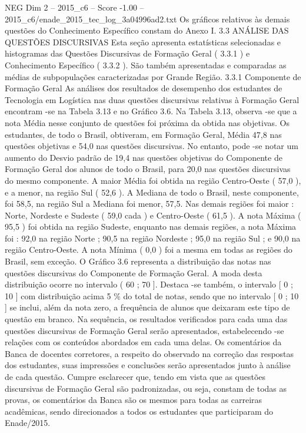\begin{textsample}{NEG Dim 2 – 2015\_c6 – Score -1.00 – 2015\_c6/enade\_2015\_tec\_log\_3a04996ad2.txt}
Os gráficos relativos às demais questões do Conhecimento Específico constam do Anexo I. 3.3 ANÁLISE DAS QUESTÕES DISCURSIVAS Esta seção apresenta estatísticas selecionadas e histogramas das Questões Discursivas de Formação Geral ( 3.3.1 ) e Conhecimento Específico ( 3.3.2 ).
São também apresentadas e comparadas as médias de subpopulações caracterizadas por Grande Região. 3.3.1 Componente de Formação Geral As análises dos resultados de desempenho dos estudantes de Tecnologia em Logística nas duas questões discursivas relativas à Formação Geral encontram -se na Tabela 3.13 e no Gráfico 3.6.
Na Tabela 3.13, observa -se que a nota Média nesse conjunto de questões foi próxima da obtida nas objetivas.
Os estudantes, de todo o Brasil, obtiveram, em Formação Geral, Média 47,8 nas questões objetivas e 54,0 nas questões discursivas.
No entanto, pode -se notar um aumento do Desvio padrão de 19,4 nas questões objetivas do Componente de Formação Geral dos alunos de todo o Brasil, para 20,0 nas questões discursivas do mesmo componente.
A maior Média foi obtida na região Centro-Oeste ( 57,0 ), e a menor, na região Sul ( 52,6 ).
A Mediana de todo o Brasil, neste componente, foi 58,5, na região Sul a Mediana foi menor, 57,5.
Nas demais regiões foi maior : Norte, Nordeste e Sudeste ( 59,0 cada ) e Centro-Oeste ( 61,5 ).
A nota Máxima ( 95,5 ) foi obtida na região Sudeste, enquanto nas demais regiões, a nota Máxima foi : 92,0 na região Norte ; 90,5 na região Nordeste ; 95,0 na região Sul ; e 90,0 na região Centro-Oeste.
A nota Mínima ( 0,0 ) foi a mesma em todas as regiões do Brasil, sem exceção.
O Gráfico 3.6 representa a distribuição das notas nas questões discursivas do Componente de Formação Geral.
A moda desta distribuição ocorre no intervalo ( 60 ; 70 ].
Destaca -se também, o intervalo [ 0 ; 10 ] com distribuição acima 5 \% do total de notas, sendo que no intervalo [ 0 ; 10 ] se inclui, além da nota zero, a frequência de alunos que deixaram este tipo de questão em branco.
Na sequência, os resultados verificados para cada uma das questões discursivas de Formação Geral serão apresentados, estabelecendo -se relações com os conteúdos abordados em cada uma delas.
Os comentários da Banca de docentes corretores, a respeito do observado na correção das respostas dos estudantes, suas impressões e conclusões serão apresentados junto à análise de cada questão.
Cumpre esclarecer que, tendo em vista que as questões discursivas de Formação Geral são padronizadas, ou seja, constam de todas as provas, os comentários da Banca são os mesmos para todas as carreiras acadêmicas, sendo direcionados a todos os estudantes que participaram do Enade/2015.

\end{textsample}

